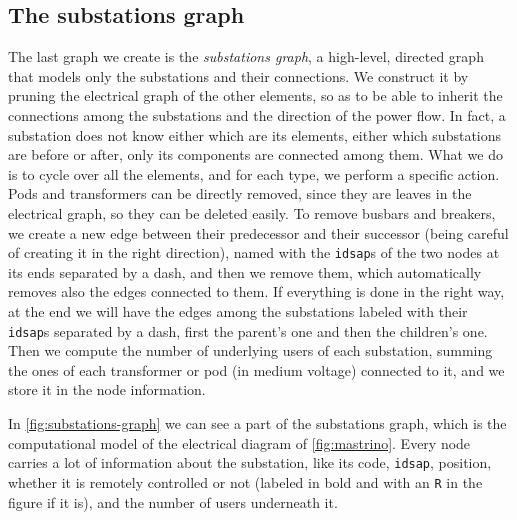 \subsection{The substations graph}

The last graph we create is the \emph{substations graph}, a high-level, directed graph that models only the substations and their connections. We construct it by pruning the electrical graph of the other elements, so as to be able to inherit the connections among the substations and the direction of the power flow. In fact, a substation does not know either which are its elements, either which substations are before or after, only its components are connected among them. What we do is to cycle over all the elements, and for each type, we perform a specific action. Pods and transformers can be directly removed, since they are leaves in the electrical graph, so they can be deleted easily. To remove busbars and breakers, we create a new edge between their predecessor and their successor (being careful of creating it in the right direction), named with the \texttt{idsap}s of the two nodes at its ends separated by a dash, and then we remove them, which automatically removes also the edges connected to them. If everything is done in the right way, at the end we will have the edges among the substations labeled with their \texttt{idsap}s separated by a dash, first the parent's one and then the children's one. Then we compute the number of underlying users of each substation, summing the ones of each transformer or pod (in medium voltage) connected to it, and we store it in the node information.

In \autoref{fig:substations-graph} we can see a part of the substations graph, which is the computational model of the electrical diagram of \autoref{fig:mastrino}. Every node carries a lot of information about the substation, like its code, \texttt{idsap}, position, whether it is remotely controlled or not (labeled in bold and with an \texttt{R} in the figure if it is), and the number of users underneath it.

